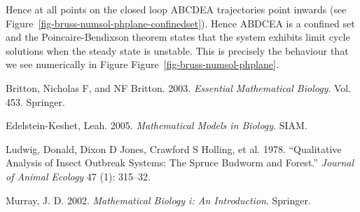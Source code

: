 \documentclass[
  letterpaper,
  DIV=11,
  numbers=noendperiod]{scrreprt}
\newlength{\cslhangindent}
\newlength{\cslentryspacingunit} %
\newenvironment{CSLReferences}[2] %
 {%
  \setlength{\parindent}{0pt}
  \ifodd #1
  \let\oldpar\par
  \def\par{\hangindent=\cslhangindent\oldpar}
  \fi
  \setlength{\parskip}{#2\cslentryspacingunit}
 }%
 {}
\begin{document}
Hence at all points on the closed loop ABCDEA trajectories point inwards
(see Figure~\ref{fig-bruss-numsol-phplane-confinedset}). Hence ABDCEA is
a confined set and the Poincaire-Bendixson theorem states that the
system exhibits limit cycle solutions when the steady state is unstable.
This is precisely the behaviour that we see numerically in Figure
Figure~\ref{fig-bruss-numsol-phplane}.

\hypertarget{refs}{}
\begin{CSLReferences}{1}{0}
\leavevmode{}%
Britton, Nicholas F, and NF Britton. 2003. \emph{Essential Mathematical
Biology}. Vol. 453. Springer.

\leavevmode{}%
Edelstein-Keshet, Leah. 2005. \emph{Mathematical Models in Biology}.
SIAM.

\leavevmode{}%
Ludwig, Donald, Dixon D Jones, Crawford S Holling, et al. 1978.
{``Qualitative Analysis of Insect Outbreak Systems: The Spruce Budworm
and Forest.''} \emph{Journal of Animal Ecology} 47 (1): 315--32.

\leavevmode{}%
Murray, J. D. 2002. \emph{Mathematical Biology i: An Introduction}.
Springer.

\end{CSLReferences}
\end{document}
